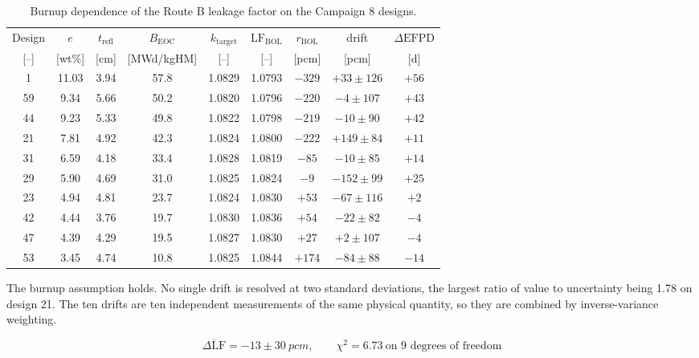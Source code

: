 \begin{table}[htbp]
  \centering
  \small
  \caption[Burnup dependence of the Route B leakage factor]{Burnup
  dependence of the Route B leakage factor on the Campaign 8 designs.}
  \label{tab:kt-burnup}
  \setlength{\tabcolsep}{4.2pt}
  \begin{tabular}{ccccccccc}
    \toprule
    Design & $e$ & $t_\mathrm{refl}$ & $B_\mathrm{EOC}$ &
      $k_\mathrm{target}$ & $\mathrm{LF}_\mathrm{BOL}$ &
      $r_\mathrm{BOL}$ & drift & $\Delta\mathrm{EFPD}$ \\
    {[--]} & [wt\%] & [cm] & [MWd/kgHM] & [--] & [--] & [pcm] & [pcm] &
      [d] \\
    \midrule
     1 & 11.03 & 3.94 & 57.8 & 1.0829 & 1.0793 & $-329$ & $+33 \pm 126$ & $+56$ \\
    59 &  9.34 & 5.66 & 50.2 & 1.0820 & 1.0796 & $-220$ & $ -4 \pm 107$ & $+43$ \\
    44 &  9.23 & 5.33 & 49.8 & 1.0822 & 1.0798 & $-219$ & $-10 \pm  90$ & $+42$ \\
    21 &  7.81 & 4.92 & 42.3 & 1.0824 & 1.0800 & $-222$ & $+149 \pm 84$ & $+11$ \\
    31 &  6.59 & 4.18 & 33.4 & 1.0828 & 1.0819 & $ -85$ & $-10 \pm  85$ & $+14$ \\
    29 &  5.90 & 4.69 & 31.0 & 1.0825 & 1.0824 & $  -9$ & $-152 \pm 99$ & $+25$ \\
    23 &  4.94 & 4.81 & 23.7 & 1.0824 & 1.0830 & $ +53$ & $-67 \pm 116$ & $ +2$ \\
    42 &  4.44 & 3.76 & 19.7 & 1.0830 & 1.0836 & $ +54$ & $-22 \pm  82$ & $ -4$ \\
    47 &  4.39 & 4.29 & 19.5 & 1.0827 & 1.0830 & $ +27$ & $ +2 \pm 107$ & $ -4$ \\
    53 &  3.45 & 4.74 & 10.8 & 1.0825 & 1.0844 & $+174$ & $-84 \pm  88$ & $-14$ \\
    \bottomrule
  \end{tabular}
\end{table}

The burnup assumption holds. No single drift is resolved at two
standard deviations, the largest ratio of value to uncertainty being
\num{1.78} on design 21. The ten drifts are ten independent
measurements of the same physical quantity, so they are combined by
inverse-variance weighting.

\begin{equation}
\overline{\Delta\mathrm{LF}} = -13 \pm \SI{30}{pcm},
\qquad
\chi^2 = 6.73 \ \text{on 9 degrees of freedom}
\label{eq:kt-comp}
\end{equation}

